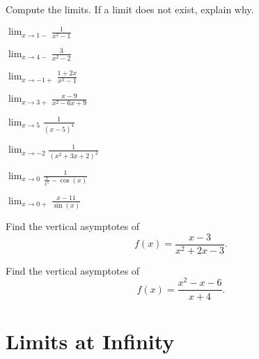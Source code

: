 \begin{exercises}

\noindent Compute the limits. If a limit does not exist, explain why.
\twocol
\begin{exercise}
$\lim_{x\to 1-} \frac{1}{x^2-1}$
\end{exercise}

\begin{exercise}
$\lim_{x\to 4-} \frac{3}{x^2-2}$
\end{exercise}

\begin{exercise}
$\lim_{x\to -1+} \frac{1+2x}{x^3-1}$
\end{exercise}

\begin{exercise}
$\lim_{x\to 3+} \frac{x-9}{x^2-6x+9}$
\end{exercise}

\begin{exercise}
$\lim_{x\to 5} \frac{1}{(x-5)^4}$
\end{exercise}


\begin{exercise}
$\lim_{x\to -2} \frac{1}{(x^2+3x+2)^2}$
\end{exercise}


\begin{exercise}
$\lim_{x\to 0} \frac{1}{\frac{x}{x^5}-\cos(x)}$
\end{exercise}

\begin{exercise}
$\lim_{x\to 0+} \frac{x-11}{\sin(x)}$
\end{exercise}



\endtwocol


\begin{exercise}
Find the vertical asymptotes of
\[
f(x) = \frac{x-3}{x^2+2x-3}.
\]
\end{exercise}


\begin{exercise}
Find the vertical asymptotes of
\[
f(x) = \frac{x^2-x-6}{x+4}.
\]
\end{exercise}

\end{exercises}






\section{Limits at Infinity}


